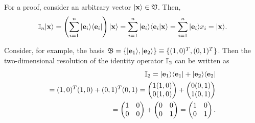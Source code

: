 {\color{OliveGreen}
\bproof

For a proof, consider an arbitrary vector $\vert {\bf x} \rangle  \in {\frak V}$.
Then,
\begin{equation}
 {\Bbb I}_n \vert {\bf x} \rangle
 =
\left(\sum_{i=1}^n \vert {\bf e}_i \rangle \langle {\bf e}_i \vert \right)
\vert {\bf x} \rangle
=
\sum_{i=1}^n \vert {\bf e}_i \rangle \langle {\bf e}_i \vert {\bf x} \rangle
=
\sum_{i=1}^n \vert {\bf e}_i \rangle  x_i
=  \vert {\bf x} \rangle
.
\end{equation}
\eproof
}


{\color{blue}
\bexample
Consider, for example, the basis
${\frak B}=\{ \vert {\bf e}_1 \rangle , \vert {\bf e}_2 \rangle \} \equiv \{(1,0)^T,(0,1)^T\}$.
Then the two-dimensional resolution of the identity operator ${\Bbb I}_2$
can be written as
\begin{equation}
\begin{split}
{\Bbb I}_2 =   \vert {\bf e}_1 \rangle \langle  {\bf e}_1 \vert   +     \vert {\bf e}_2 \rangle  \langle  {\bf e}_2 \vert \\
=   (1,0)^T (1,0) +   (0,1)^T (0,1)
=
\begin{pmatrix}
1 (1,0) \\  0 (1,0)
\end{pmatrix}
 +
\begin{pmatrix}
0 (0,1)\\
1 (0,1)
\end{pmatrix} \\
 =
\begin{pmatrix}
1 & 0 \\
0 & 0
\end{pmatrix}
+
\begin{pmatrix}
0 & 0 \\
0 & 1
\end{pmatrix}
=
\begin{pmatrix}
1 & 0 \\
0 & 1
\end{pmatrix}
.
\end{split}
\end{equation}

}
